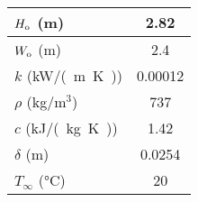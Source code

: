 \begin{table}[!ht]
\begin{center}
\begin{tabular}{|c|c|c|}
\multicolumn{2}{|l|}{$H\sb{o}$ (m)}               &  \multicolumn{1}{c|}{2.82}        \\ \hline
\multicolumn{2}{|l|}{$W\sb{o}$ (m)}               &  \multicolumn{1}{c|}{2.4}         \\ \hline
\multicolumn{2}{|l|}{$k$ (\si{kW/(m.K)})}         &  \multicolumn{1}{c|}{0.00012}     \\ \hline
\multicolumn{2}{|l|}{$\rho$ (kg/m$^3$)}           &  \multicolumn{1}{c|}{737}         \\ \hline
\multicolumn{2}{|l|}{$c$ (\si{kJ/(kg.K)})}        &  \multicolumn{1}{c|}{1.42}        \\ \hline
\multicolumn{2}{|l|}{$\delta$ (m)}                &  \multicolumn{1}{c|}{0.0254}      \\ \hline
\multicolumn{2}{|l|}{$T_\infty$ (\si{\celsius})}  &  \multicolumn{1}{c|}{20}          \\ \hline
\end{tabular}
\end{center}
\end{table}

